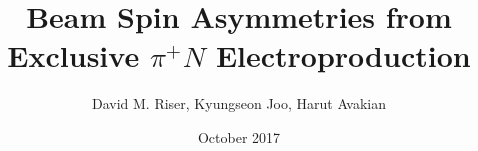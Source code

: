 \title{Beam Spin Asymmetries from Exclusive $\pi^{+} N$ Electroproduction}
\author{David M. Riser, Kyungseon Joo, Harut Avakian}
\date{October 2017}

